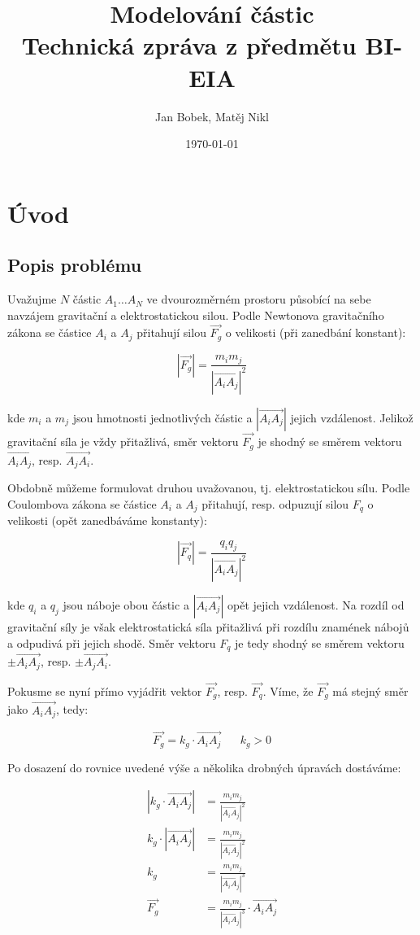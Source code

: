 \documentclass[10pt,a4paper]{article}
\title{Modelování částic \\ Technická zpráva z předmětu BI-EIA}
\author{Jan Bobek, Matěj Nikl}
\date{\today}
\begin{document}
\maketitle

\section{Úvod}

\subsection{Popis problému}
Uvažujme $ N $ částic $ A_1\ldots A_N $ ve dvourozměrném prostoru působící
na sebe navzájem gravitační a elektrostatickou silou. Podle Newtonova
gravitačního zákona se částice $ A_i $ a $ A_j $ přitahují silou $ \vec{F_g} $
o velikosti (při zanedbání konstant):

$$ |\vec{F_g}| = \frac{m_i m_j}{|\vec{A_i A_j}|^2} $$

kde $ m_i $ a $ m_j $ jsou hmotnosti jednotlivých částic a
$ |\vec{A_i A_j}| $ jejich vzdálenost. Jelikož gravitační síla je vždy
přitažlivá, směr vektoru $ \vec{F_g} $ je shodný se směrem vektoru
$ \vec{A_i A_j} $, resp. $ \vec{A_j A_i} $.

Obdobně můžeme formulovat druhou uvažovanou, tj. elektrostatickou sílu.
Podle Coulombova zákona se částice $ A_i $ a $ A_j $ přitahují, resp. odpuzují
silou $ F_q $ o velikosti (opět zanedbáváme konstanty):

$$ |\vec{F_q}| = \frac{q_i q_j}{|\vec{A_i A_j}|^2} $$

kde $ q_i $ a $ q_j $ jsou náboje obou částic a $ |\vec{A_i A_j}| $
opět jejich vzdálenost. Na rozdíl od gravitační síly je však elektrostatická
síla přitažlivá při rozdílu znamének nábojů a odpudivá při jejich shodě. Směr
vektoru $ F_q $ je tedy shodný se směrem vektoru $ \pm\vec{A_i A_j} $, resp.
$ \pm\vec{A_j A_i} $.

Pokusme se nyní přímo vyjádřit vektor $ \vec{F_g} $, resp. $ \vec{F_q} $.
Víme, že $ \vec{F_g} $ má stejný směr jako $ \vec{A_i A_j} $, tedy:

$$ \vec{F_g} = k_g\cdot\vec{A_i A_j} \hspace{20pt} k_g > 0 $$

Po dosazení do rovnice uvedené výše a několika drobných úpravách dostáváme:

\begin{align*}
|k_g\cdot\vec{A_i A_j}| &= \frac{m_i m_j}{|\vec{A_i A_j}|^2} \\
k_g\cdot|\vec{A_i A_j}| &= \frac{m_i m_j}{|\vec{A_i A_j}|^2} \\
k_g &= \frac{m_i m_j}{|\vec{A_i A_j}|^3} \\
\vec{F_g} &= \frac{m_i m_j}{|\vec{A_i A_j}|^3} \cdot \vec{A_i A_j}
\end{align*}
\end{document}
